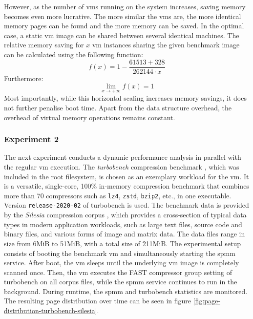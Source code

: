 However, as the number of \acp{vm} running on the system increases, saving memory becomes even more lucrative.
The more similar the \acp{vm} are, the more identical memory pages can be found and the more memory can be saved.
In the optimal case, a static \ac{vm} image can be shared between several identical machines.
The relative memory saving for $x$ \ac{vm} instances sharing the given benchmark image can be calculated using the following function:
$$f(x) = 1 - \frac{61513 + 328}{262144 \cdot x}$$
Furthermore:
$$ \lim_{x \to +\infty} f(x) = 1$$
Most importantly, while this horizontal scaling increases memory savings, it does not further penalise boot time.
Apart from the  data structure overhead, the overhead of virtual memory operations remains constant.

%  

\subsubsection*{Experiment 2}
\label{subsubsec:ex2}

The next experiment conducts a dynamic performance analysis in parallel with the regular \ac{vm} execution.
The \emph{turbobench} compression benchmark \cite{turbobench}, which was included in the root filesystem, is chosen as an exemplary workload for the \ac{vm}.
It is a versatile, single-core, 100\% in-memory compression benchmark that combines more than 70 compressors such as \texttt{lz4}, \texttt{zstd}, \texttt{bzip2}, etc., in one executable.
Version \texttt{release-2020-02} of turbobench is used.
The benchmark data is provided by the \emph{Silesia} compression corpus \cite{silesia-corpus}, which provides a cross-section of typical data types in modern application workloads, such as large text files, source code and binary files, and various forms of image and matrix data.
The data files range in size from 6MiB to 51MiB, with a total size of 211MiB.
The experimental setup consists of booting the benchmark \ac{vm} and simultaneously starting the \ac{spmm} service.
After boot, the \ac{vm} sleeps until the underlying \ac{vm} image is completely scanned once.
Then, the \ac{vm} executes the FAST compressor group setting of turbobench on all corpus files, while the \ac{spmm} service continues to run in the background.
During runtime, the \ac{spmm} and turbobench statistics are monitored.
The resulting page distribution over time can be seen in figure \ref{fig:page-distribution-turbobench-silesia}.

